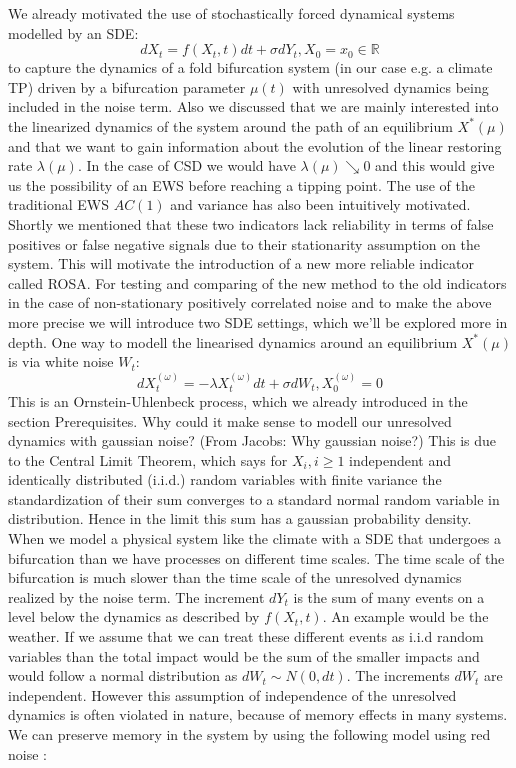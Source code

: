 \documentclass[%
thesis=student,%
coverpage=false,%
titlepage=false,%
headmarks=true, %
german,%
font=libertine, %
math=newpxtx, %
BCOR=5mm,%
coverBCOR=11mm%
]{tumbook}
\begin{document}
We already motivated the use of stochastically forced dynamical systems modelled by an SDE:
\[
    dX_{t} = f(X_{t},t)dt + \sigma dY_{t}, X_{0} = x_{0} \in \mathbb{R}
\]
to capture the dynamics of a fold bifurcation system (in our case e.g. a climate TP) driven by a bifurcation parameter $\mu(t)$ with unresolved dynamics being included in the noise term. Also we discussed that we are mainly interested into the linearized dynamics of the system around the path of an equilibrium $X^{*}(\mu)$ and that we want to gain information about the evolution of the linear restoring rate $\lambda(\mu)$. In the case of CSD we would have $\lambda(\mu) \searrow 0$ and this would give us the possibility of an EWS before reaching a tipping point. The use of the traditional EWS $AC(1)$ and variance has also been intuitively motivated. Shortly we mentioned that these two indicators lack reliability in terms of false positives or false negative signals due to their stationarity assumption on the system. This will motivate the introduction of a new more reliable indicator called ROSA. For testing and comparing of the new method to the old indicators in the case of non-stationary positively correlated noise and to make the above more precise we will introduce two SDE settings, which we'll be explored more in depth. One way to modell the linearised dynamics around an equilibrium $X^{*}(\mu)$ is via white noise $W_{t}$:
\begin{equation}
        dX_{t}^{(\omega)} = -\lambda X_{t}^{(\omega)}dt + \sigma dW_{t}, X_{0}^{(\omega)} = 0 \label{eq: 3.1}
\end{equation}
This is an Ornstein-Uhlenbeck process, which we already introduced in the section Prerequisites. Why could it make sense to modell our unresolved dynamics with gaussian noise? (From Jacobs: Why gaussian noise?) This is due to the Central Limit Theorem, which says for $X_{i}, i \geq 1$ independent and identically distributed (i.i.d.) random variables with finite variance the standardization of their sum converges to a standard normal random variable in distribution. Hence in the limit this sum has a gaussian probability density. When we model a physical system like the climate with a SDE that undergoes a bifurcation than we have processes on different time scales. The time scale of the bifurcation is much slower than the time scale of the unresolved dynamics realized by the noise term. The increment $dY_{t}$ is the sum of many events on a level below the dynamics as described by $f(X_{t},t)$. An example would be the weather. If we assume that we can treat these different events as i.i.d random variables than the total impact would be the sum of the smaller impacts and would follow a normal distribution as $dW_{t} \sim N(0,dt)$. \cite{Kurt:2010} 
The increments $dW_{t}$ are independent. However this assumption of independence of the unresolved dynamics is often violated in nature, because of memory effects in many systems. We can preserve memory in the system by using the following model using red noise \cite{Hanggi:1994,Morr:2022}:
\end{document}
